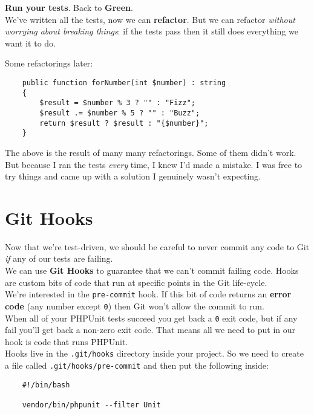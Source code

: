 \textbf{Run your tests}. Back to \textbf{Green}.
\\

We've written all the tests, now we can \textbf{refactor}. But we can refactor \textit{without worrying about breaking things}: if the tests pass then it still does everything we want it to do.
\\

\hr

Some refactorings later:

\begin{verbatim}
    public function forNumber(int $number) : string
    {
        $result = $number % 3 ? "" : "Fizz";
        $result .= $number % 5 ? "" : "Buzz";
        return $result ? $result : "{$number}";
    }
\end{verbatim}

The above is the result of many many refactorings. Some of them didn't work. But because I ran the tests \textit{every} time, I knew I'd made a mistake. I was free to try things and came up with a solution I genuinely wasn't expecting.


\section{Git Hooks}

Now that we're test-driven, we should be careful to never commit any code to Git \textit{if} any of our tests are failing.
\\

We can use \textbf{Git Hooks} to guarantee that we can't commit failing code. Hooks are custom bits of code that run at specific points in the Git life-cycle.
\\

We're interested in the \texttt{pre-commit} hook. If this bit of code returns an \textbf{error code} (any number except \texttt{0}) then Git won't allow the commit to run.
\\

When all of your PHPUnit tests succeed you get back a \texttt{0} exit code, but if any fail you'll get back a non-zero exit code. That means all we need to put in our hook is code that runs PHPUnit.
\\

Hooks live in the \texttt{.git/hooks} directory inside your project. So we need to create a file called \texttt{.git/hooks/pre-commit} and then put the following inside:

\begin{verbatim}
    #!/bin/bash

    vendor/bin/phpunit --filter Unit
\end{verbatim}

